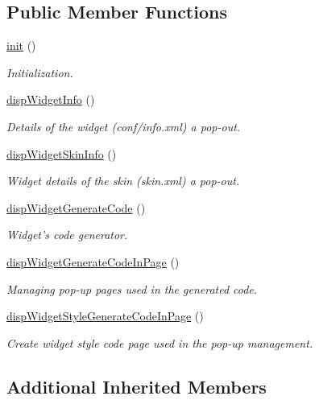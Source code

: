 \subsection*{Public Member Functions}
\begin{DoxyCompactItemize}
\item 
\hyperlink{classwidgetView_aae33eb1e6769bef674ec184703a6bac2}{init} ()
\begin{DoxyCompactList}\small\item\em Initialization. \end{DoxyCompactList}\item 
\hyperlink{classwidgetView_aa0744579c05eacb742561abbc967c720}{disp\-Widget\-Info} ()
\begin{DoxyCompactList}\small\item\em Details of the widget (conf/info.\-xml) a pop-\/out. \end{DoxyCompactList}\item 
\hyperlink{classwidgetView_a7d7203cb8a9ddec4628beb6ae1f55ff5}{disp\-Widget\-Skin\-Info} ()
\begin{DoxyCompactList}\small\item\em Widget details of the skin (skin.\-xml) a pop-\/out. \end{DoxyCompactList}\item 
\hyperlink{classwidgetView_af0e573b3b57857bc0941237399e21b19}{disp\-Widget\-Generate\-Code} ()
\begin{DoxyCompactList}\small\item\em Widget's code generator. \end{DoxyCompactList}\item 
\hyperlink{classwidgetView_a0600670ca5dac17d9549bacecd90c3cf}{disp\-Widget\-Generate\-Code\-In\-Page} ()
\begin{DoxyCompactList}\small\item\em Managing pop-\/up pages used in the generated code. \end{DoxyCompactList}\item 
\hyperlink{classwidgetView_a0bc95329be4497bd1b8dbb7702b51e2c}{disp\-Widget\-Style\-Generate\-Code\-In\-Page} ()
\begin{DoxyCompactList}\small\item\em Create widget style code page used in the pop-\/up management. \end{DoxyCompactList}\end{DoxyCompactItemize}
\subsection*{Additional Inherited Members}


